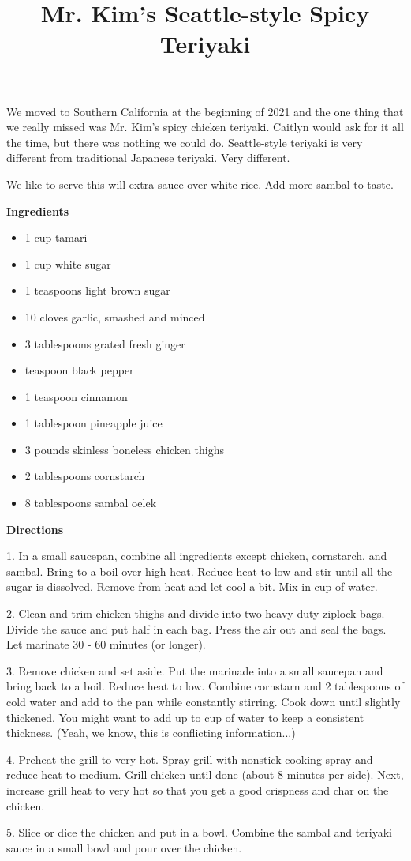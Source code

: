 \documentclass{article}
\title{Mr. Kim's Seattle-style Spicy Teriyaki}
\begin{document}
We moved to Southern California at the beginning of 2021 and the one thing
that we really missed was Mr. Kim's spicy chicken teriyaki. Caitlyn would
ask for it all the time, but there was nothing we could do. Seattle-style
teriyaki is very different from traditional Japanese teriyaki. Very different.

We like to serve this will extra sauce over white rice. Add more sambal to taste.

\bigskip

\bigskip

\textbf{Ingredients}

\begin{itemize}
    \item 1 cup tamari
    \item 1 cup white sugar
    \item 1 teaspoons light brown sugar
    \item 10 cloves garlic, smashed and minced
    \item 3 tablespoons grated fresh ginger
    \item {} teaspoon black pepper
    \item 1 teaspoon cinnamon
    \item 1 tablespoon pineapple juice
    \item 3 pounds skinless boneless chicken thighs
    \item 2 tablespoons cornstarch
    \item 8 tablespoons sambal oelek
\end{itemize}

\bigskip

\textbf{Directions}

1. In a small saucepan, combine all ingredients except chicken, cornstarch, and sambal.
Bring to a boil over high heat. Reduce heat to low and stir until all the sugar is
dissolved. Remove from heat and let cool a bit. Mix in  cup of water.

2. Clean and trim chicken thighs and divide into two heavy duty ziplock bags. Divide the
sauce and put half in each bag. Press the air out and seal the bags. Let marinate 30 - 60
minutes (or longer).

3. Remove chicken and set aside. Put the marinade into a small saucepan and bring back
to a boil. Reduce heat to low. Combine cornstarn and 2 tablespoons of cold water and
add to the pan while constantly stirring. Cook down until slightly thickened. You might
want to add up to  cup of water to keep a consistent thickness. (Yeah, we know, this
is conflicting information...)

4. Preheat the grill to very hot. Spray grill with nonstick cooking spray and reduce
heat to medium. Grill chicken until done (about 8 minutes per side). Next, increase grill
heat to very hot so that you get a good crispness and char on the chicken.

5. Slice or dice the chicken and put in a bowl. Combine the sambal and teriyaki sauce in
a small bowl and pour over the chicken.

\end{document}
